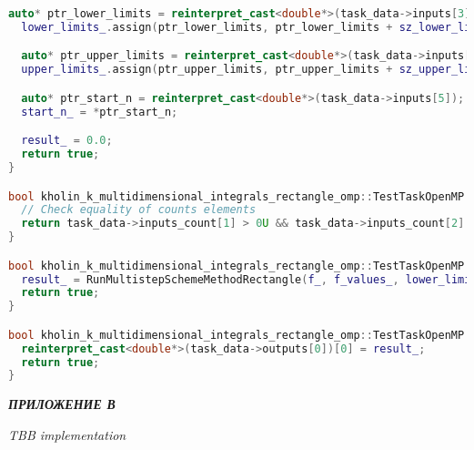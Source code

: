\documentclass[14pt,a4paper]{article}
\begin{document}
\begin{framed}
\begin{lstlisting}[language=C++]
  auto* ptr_lower_limits = reinterpret_cast<double*>(task_data->inputs[3]);
  lower_limits_.assign(ptr_lower_limits, ptr_lower_limits + sz_lower_limits_);

  auto* ptr_upper_limits = reinterpret_cast<double*>(task_data->inputs[4]);
  upper_limits_.assign(ptr_upper_limits, ptr_upper_limits + sz_upper_limits_);

  auto* ptr_start_n = reinterpret_cast<double*>(task_data->inputs[5]);
  start_n_ = *ptr_start_n;

  result_ = 0.0;
  return true;
}

bool kholin_k_multidimensional_integrals_rectangle_omp::TestTaskOpenMP::ValidationImpl() {
  // Check equality of counts elements
  return task_data->inputs_count[1] > 0U && task_data->inputs_count[2] > 0U;
}

bool kholin_k_multidimensional_integrals_rectangle_omp::TestTaskOpenMP::RunImpl() {
  result_ = RunMultistepSchemeMethodRectangle(f_, f_values_, lower_limits_, upper_limits_, dim_, start_n_);
  return true;
}

bool kholin_k_multidimensional_integrals_rectangle_omp::TestTaskOpenMP::PostProcessingImpl() {
  reinterpret_cast<double*>(task_data->outputs[0])[0] = result_;
  return true;
}

\end{lstlisting}
\end{framed}

\newpage

{\raggedright\textit{\large\bfseries ПРИЛОЖЕНИЕ В}\par}

\textit{TBB implementation}
\end{document}
